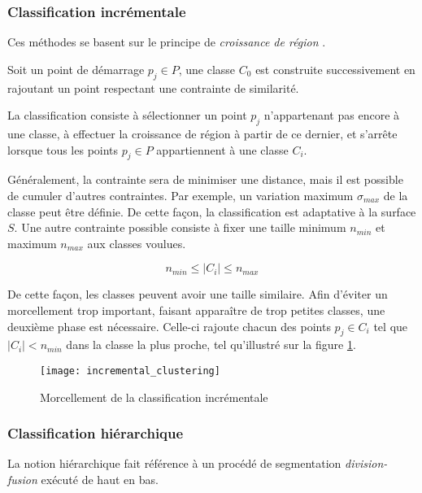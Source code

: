 \subsubsection{Classification incrémentale}
Ces méthodes se basent sur le principe de \emph{croissance de région} .

\begin{definition}
  Soit un point de démarrage $p_j \in P$, une classe $C_0$ est construite successivement en rajoutant un point respectant une contrainte de similarité.
\end{definition}

La classification consiste à sélectionner un point $p_j$ n'appartenant pas encore à une classe, à effectuer la croissance de région à partir de ce dernier, et s'arrête lorsque tous les points $p_j \in P$ appartiennent à une classe $C_i$.

Généralement, la contrainte sera de minimiser une distance, mais il est possible de cumuler d'autres contraintes. Par exemple, un variation maximum $\sigma_{max}$ de la classe peut être définie. De cette façon, la classification est adaptative à la surface $S$. Une autre contrainte possible consiste à fixer une taille minimum $n_{min}$ et maximum $n_{max}$ aux classes voulues.

$$n_{min} \le |C_i| \le n_{max}$$

De cette façon, les classes peuvent avoir une taille similaire. Afin d'éviter un morcellement trop important, faisant apparaître de trop petites classes, une deuxième phase est nécessaire. Celle-ci rajoute chacun des points $p_j \in C_i$ tel que $|C_i| < n_{min}$ dans la classe la plus proche, tel qu'illustré sur la figure \ref{fig:sampling_incremental_fragmentation}.

\begin{figure}
  \centering
  \texttt{[image: incremental\_clustering]}
  \caption{Morcellement de la classification incrémentale~\cite{Pauly2002} \label{fig:sampling_incremental_fragmentation}}
\end{figure}

\subsubsection{Classification hiérarchique}

La notion hiérarchique fait référence à un procédé de segmentation \emph{division-fusion} exécuté de haut en bas.


